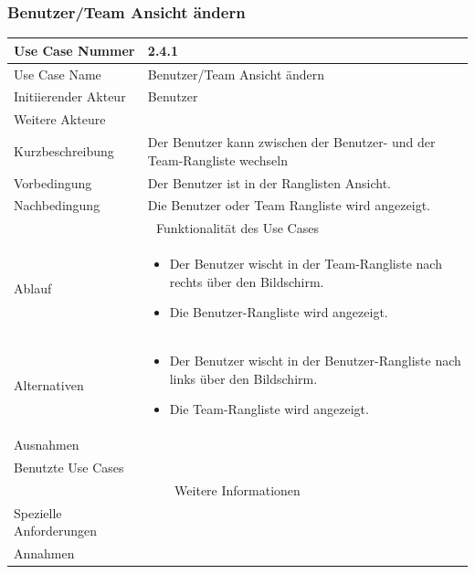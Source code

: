 \documentclass[10pt,a4paper]{article}
\begin{document}
\subsubsection{Benutzer/Team Ansicht ändern}
	\begin{tabularx}{\textwidth}{|l|X|}
	\hline Use Case Nummer & 2.4.1 \\ 
	\hline Use Case Name & Benutzer/Team Ansicht \"andern \\ 
	\hline Initiierender Akteur & Benutzer \\
	\hline Weitere Akteure &  \\
	\hline Kurzbeschreibung & Der Benutzer kann zwischen der Benutzer- und der Team-Rangliste wechseln \\
	\hline Vorbedingung & Der Benutzer ist in der Ranglisten Ansicht. \\
	\hline Nachbedingung & Die Benutzer oder Team Rangliste wird angezeigt. \\
	\hline \multicolumn{2}{|c|}{Funktionalität des Use Cases}\\
	\hline Ablauf & \begin{itemize}
		\item Der Benutzer wischt in der Team-Rangliste nach rechts über den Bildschirm.
		\item Die Benutzer-Rangliste wird angezeigt.
	\end{itemize} \\
	\hline Alternativen & \begin{itemize}
		\item Der Benutzer wischt in der Benutzer-Rangliste nach links über den Bildschirm.
		\item Die Team-Rangliste wird angezeigt.
                \end{itemize} \\
	\hline Ausnahmen &  \\
	\hline Benutzte Use Cases &  \\
	\hline \multicolumn{2}{|c|}{Weitere Informationen} \\
	\hline Spezielle Anforderungen &  \\
	\hline Annahmen &  \\
	\hline
	\end{tabularx}
\end{document}
